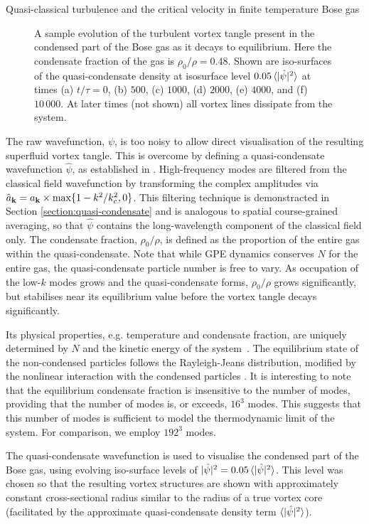 \begin{chapter}{\label{cha:nonequib}Quasi-classical turbulence and the critical velocity in finite temperature Bose gas}
\begin{figure}[!ht]
    \caption{A sample evolution of the turbulent vortex tangle present in the condensed part of the Bose gas as it decays to equilibrium. Here the condensate fraction of the gas is $\rho_0/\rho = 0.48$. Shown are iso-surfaces of the quasi-condensate density at isosurface level $0.05\braket{|\hat{\psi}|^2}$ at times (a) $t/\tau=0$, (b) $500$, (c) $1000$, (d) $2000$, (e) $4000$, and (f) $10\,000$. At later times (not shown) all vortex lines dissipate from the system.
}
    \label{fig:thermal}
\end{figure}

The raw wavefunction, $\psi$, is too noisy to allow direct visualisation of the resulting superfluid vortex tangle. This is overcome by defining a quasi-condensate wavefunction $\hat{\psi}$, as established in \cite{PhysRevA.66.013603}. High-frequency modes are filtered from the classical field wavefunction by transforming the complex amplitudes via $\hat{a}_{{\bf k}} = a_{{\bf k}}\times\max\{1-k^{2}/k_c^2,0\}$. This filtering technique is demonstracted in Section \ref{section:quasi-condensate} and is analogous to spatial course-grained averaging, so that $\hat{\psi}$ contains the long-wavelength component of the classical field only.  The condensate fraction, $\rho_0/\rho$, is defined as the proportion of the entire gas within the quasi-condensate. Note that while GPE dynamics conserves $N$ for the entire gas, the quasi-condensate particle number is free to vary. As occupation of the low-$k$ modes grows and the quasi-condensate forms, $\rho_0/\rho$ grows significantly, but stabilises near its equilibrium value before the vortex tangle decays significantly. 

Its physical properties, e.g. temperature and condensate fraction, are uniquely determined by $N$ and the kinetic energy of the system~\cite{PhysRevLett.95.263901}.  The equilibrium state of the non-condensed particles follows the Rayleigh-Jeans distribution, modified by the nonlinear interaction with the condensed particles \cite{PhysRevLett.95.263901}.  It is interesting to note that the equilibrium condensate fraction is insensitive to the number of modes, providing that the number of modes is, or exceeds, $16^3$ modes.  This suggests that this number of modes is sufficient to model the thermodynamic limit of the system. For comparison, we employ $192^3$ modes.

The quasi-condensate wavefunction is used to visualise the condensed part of the Bose gas, using evolving iso-surface levels of $|\hat{\psi}|^2 = 0.05\braket{|\hat{\psi}|^2}$. This level was chosen so that the resulting vortex structures are shown with approximately constant cross-sectional radius similar to the radius of a true vortex core (facilitated by the approximate quasi-condensate density term $\braket{|\hat{\psi}|^2}$).


\end{chapter}

